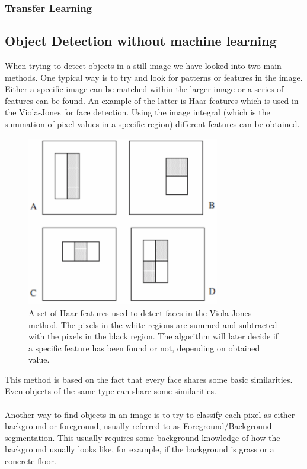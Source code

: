 \subsubsection{Transfer Learning}


\subsection{Object Detection without machine learning}

When trying to detect objects in a still image we have looked into two main methods. One typical way is to try and look for patterns or features in the image.
Either a specific image can be matched within the larger image or a series of features can be found.
An example of the latter is Haar features which is used in the Viola-Jones for face detection. Using the image integral (which is the summation of pixel values in a specific region) different features can be obtained.

\begin{figure}[hbtp]
\begin{center}
\includegraphics[width = 0.75\textwidth]{./Images/viola-jones.jpg} 
\caption{A set of Haar features used to detect faces in the Viola-Jones method. The pixels in the white regions are summed and subtracted with the pixels in the black region. The algorithm will later decide if a specific feature has been found or not, depending on obtained value.}
\end{center}
\end{figure}

This method is based on the fact that every face shares some basic similarities. Even objects of the same type can share some similarities.\cite{violaJones}
\\\\
Another way to find objects in an image is to try to classify each pixel as either background or foreground, usually referred to as Foreground/Background-segmentation. This usually requires some background knowledge of how the background usually looks like, for example, if the background is grass or a concrete floor.

